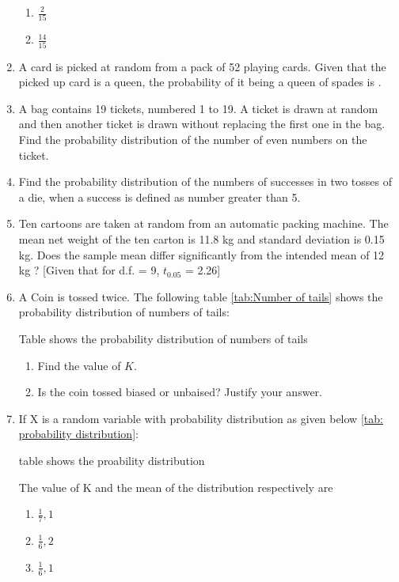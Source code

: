 \begin{enumerate}
\begin{enumerate}
\item $\frac{2}{15}$
\item $\frac{14}{15}$
\end{enumerate}
\item A card is picked at random from a pack of 52 playing cards. Given that the picked up card is a queen, the probability of it being a queen of spades is \underline{\hspace{1cm}}.
\item A bag contains 19 tickets, numbered 1 to 19. A ticket is drawn at random and then another ticket is drawn without replacing the first one in the bag. Find the probability distribution of the number of even numbers on the ticket.
\item Find the probability distribution of the numbers of successes in two tosses of a die, when a success is defined as number greater than 5.
\item Ten cartoons are taken at random from an automatic packing machine. The mean net weight of the ten carton is 11.8 kg and standard deviation is 0.15 kg. Does the sample mean differ significantly from the intended mean of 12 kg ?
[Given that for d.f. = 9, $t_{0.05}$ = 2.26]
\item A Coin is tossed twice. The following table \ref{tab:Number of tails} shows the probability distribution of numbers of tails:
\begin{table}[!ht]
	
\caption{Table shows the probability distribution of numbers of tails \label{tab:Number of tails}}
\end{table}
\begin{enumerate}
\item Find the value of $K$.
\item Is the coin tossed biased or unbaised?
Justify your answer.
\end{enumerate}
\item If X is a random variable with probability distribution as given below \ref{tab: probability distribution}:
\begin{table}[!ht]

\caption{table shows the proability distribution \label{tab: probability distribution}}
\end{table}
\newline The value of K and the mean of the distribution respectively are 
\begin{enumerate}
\item $\frac{1}{7}, 1$
\item $\frac{1}{6}, 2$
\item $\frac{1}{6}, 1$

\end{enumerate}
\end{enumerate}
